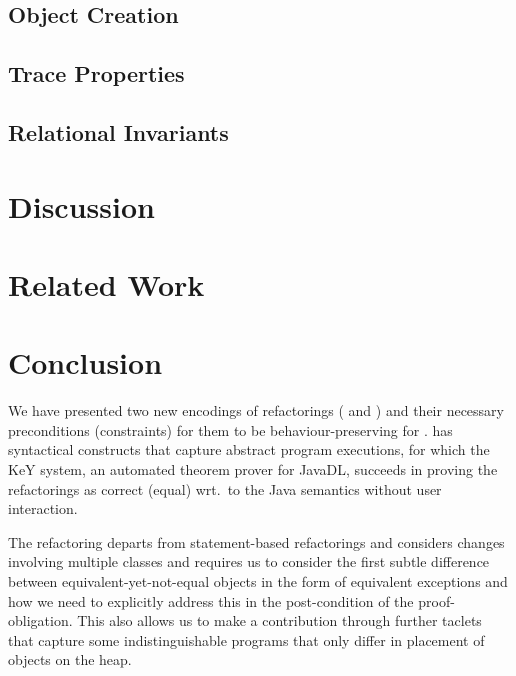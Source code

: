 \documentclass[runningheads]{llncs}
\begin{document}

\subsection{Object Creation}\label{sec:objectcreation}


\subsection{Trace Properties}\label{sec:traces}


\subsection{Relational Invariants}\label{sec:relational}


\section{Discussion}\label{sec:discussion}


\section{Related Work}\label{sec:related}



\section{Conclusion}\label{sec:conclusion}

We have presented two new encodings of refactorings ( and ) and their necessary preconditions (constraints) for them to be behaviour-preserving for \Refinity{}.
\Refinity{} has syntactical constructs that capture abstract program executions, for which the KeY system,
an automated theorem prover for JavaDL, succeeds in proving the refactorings as correct (equal) wrt.\ to the Java semantics without user interaction.

The  refactoring departs from statement-based refactorings and considers changes involving multiple classes and requires us to consider the first subtle difference between equivalent-yet-not-equal objects in the form of equivalent exceptions and how we need to explicitly address this in the post-condition of the proof-obligation.
This also allows us to make a contribution through further taclets that capture some indistinguishable programs that only differ in placement of objects on the heap.
\end{document}
